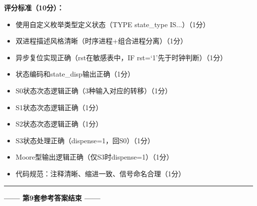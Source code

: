 \textbf{评分标准（10分）：}
\begin{itemize}
  \item 使用自定义枚举类型定义状态（TYPE state\_type IS...）\hfill（1分）
  \item 双进程描述风格清晰（时序进程+组合进程分离）\hfill（1分）
  \item 异步复位实现正确（rst在敏感表中，IF rst=`1'先于时钟判断）\hfill（1分）
  \item 状态编码和state\_disp输出正确\hfill（1分）
  \item S0状态次态逻辑正确（3种输入对应的转移）\hfill（1分）
  \item S1状态次态逻辑正确\hfill（1分）
  \item S2状态次态逻辑正确\hfill（1分）
  \item S3状态处理正确（dispense=1，回S0）\hfill（1分）
  \item Moore型输出逻辑正确（仅S3时dispense=1）\hfill（1分）
  \item 代码规范：注释清晰、缩进一致、信号命名合理\hfill（1分）
\end{itemize}

\vspace{0.5cm}
{\centering
\rule{0.8\textwidth}{0.5pt}
\vspace{0.3cm}

\textbf{—— 第9套参考答案结束 ——}

\vspace{0.5cm}}

\endinput
